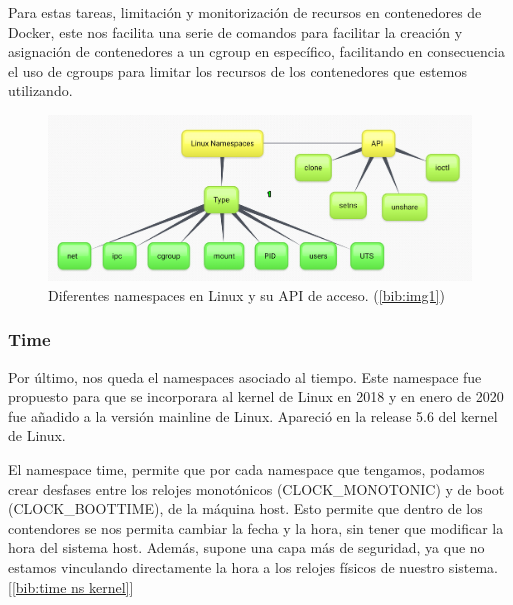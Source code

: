 \documentclass[12pt]{article}
\begin{document}
	\noindent Para estas tareas, limitación y monitorización de recursos en contenedores de Docker, este nos facilita una serie de comandos para facilitar la creación y asignación de contenedores a un cgroup en específico, facilitando en consecuencia el uso de cgroups para limitar los recursos de los contenedores que estemos utilizando.
	
	\addvspace{60px}
	
	\begin{figure}[h!]
		\begin{center}
			\includegraphics[width=1\textwidth]{img/linux-namespace1.png}
			\caption{Diferentes namespaces en Linux y su API de acceso. (\ref{bib:img1})}
		\end{center}
	\end{figure}
	
	
	\pagebreak
	\subsubsection{Time}
	\par \noindent Por último, nos queda el namespaces asociado al tiempo. Este namespace fue propuesto para que se incorporara al kernel de Linux en 2018 y en enero de 2020 fue añadido a la versión mainline de Linux. Apareció en la release 5.6 del kernel de Linux. \\
	
	\par \noindent El namespace time, permite que por cada namespace que tengamos, podamos crear desfases entre los relojes monotónicos (CLOCK\_MONOTONIC) y de boot (CLOCK\_BOOTTIME), de la máquina host. Esto permite que dentro de los contendores se nos permita cambiar la fecha y la hora, sin tener que modificar la hora del sistema host. Además, supone una capa más de seguridad, ya que no estamos vinculando directamente la hora a los relojes físicos de nuestro sistema. [\ref{bib:time ns kernel}]\\
	
\end{document}
